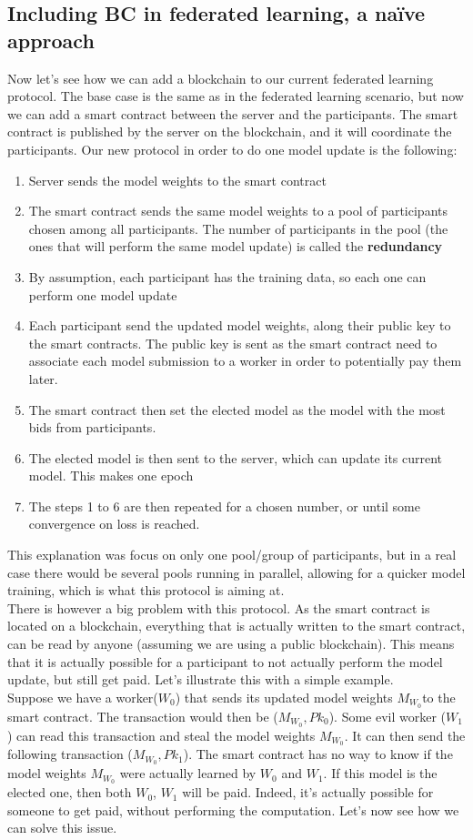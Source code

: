 \documentclass{article}
\begin{document}
\subsection{Including BC in federated learning, a naïve approach}
Now let's see how we can add a blockchain to our current federated learning protocol. The base case is the same as in
the federated learning scenario, but now we can add a smart contract between the server and the participants. The smart
contract is published by the server on the blockchain, and it will coordinate the participants. Our new protocol in
order to do one model update is the following:
\begin{enumerate}
    \item Server sends the model weights to the smart contract
    \item The smart contract sends the same model weights to a pool of participants chosen among all participants. The
number of participants in the pool (the ones that will perform the same model update) is called the \textbf{redundancy}
    \item By assumption, each participant has the training data, so each one can perform one model update
    \item Each participant send the updated model weights, along their public key to the smart contracts. The public key
is sent as the smart contract need to associate each model submission to a worker in order to potentially pay them later.
    \item The smart contract then set the elected model as the model with the most bids from participants.
    \item The elected model is then sent to the server, which can update its current model. This makes one epoch
    \item The steps 1 to 6 are then repeated for a chosen number, or until some convergence on loss is reached.
\end{enumerate}
This explanation was focus on only one pool/group of participants, but in a real case there would be several pools
running in parallel, allowing for a quicker model training, which is what this protocol is aiming at.\\
There is however a big problem with this protocol. As the smart contract is located on a blockchain, everything that is
actually written to the smart contract, can be read by anyone (assuming we are using a public blockchain). This means
that it is actually possible for a participant to not actually perform the model update, but still get paid. Let's
illustrate this with a simple example.\\
Suppose we have a worker($W_0$) that sends its updated model weights $M_{W_0}$to the smart contract. The transaction would then
be ($M_{W_0},Pk_0$). Some evil worker ($W_1$) can read this transaction and steal the model weights $M_{W_0}$. It can then send
the following transaction ($M_{W_0}, Pk_1$). The smart contract has no way to know if the model weights $M_{W_0}$ were actually
learned by $W_0$ and $W_1$. If this model is the elected one, then both $W_0$, $W_1$ will be paid. Indeed, it's actually
possible for someone to get paid, without performing the computation. Let's now see how we can solve this issue.
\end{document}
